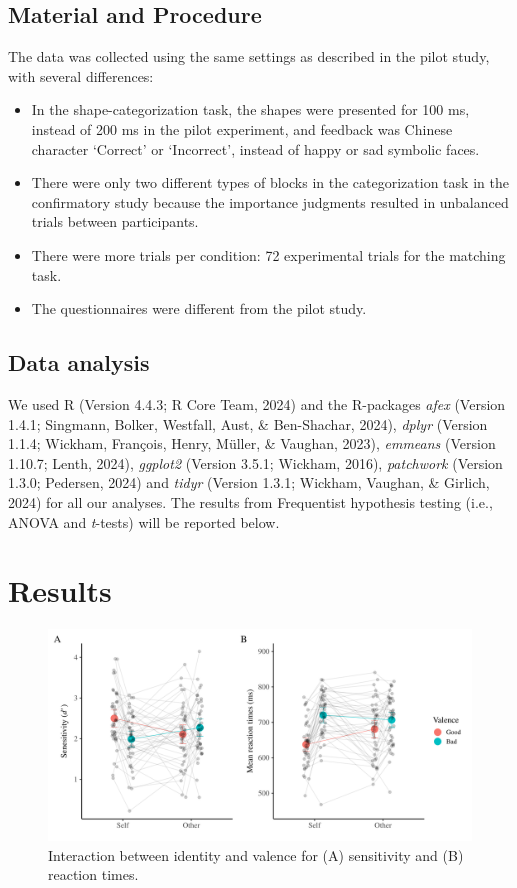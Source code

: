 \documentclass[
  man]{apa6}
\providecommand{\tightlist}{%
  \setlength{\itemsep}{0pt}\setlength{\parskip}{0pt}}
\begin{document}
\subsection{Material and Procedure}\label{material-and-procedure}

The data was collected using the same settings as described in the pilot study, with several differences:

\begin{itemize}
\tightlist
\item
  In the shape-categorization task, the shapes were presented for 100 ms, instead of 200 ms in the pilot experiment, and feedback was Chinese character `Correct' or `Incorrect', instead of happy or sad symbolic faces.
\item
  There were only two different types of blocks in the categorization task in the confirmatory study because the importance judgments resulted in unbalanced trials between participants.
\item
  There were more trials per condition: 72 experimental trials for the matching task.
\item
  The questionnaires were different from the pilot study.
\end{itemize}

\subsection{Data analysis}\label{data-analysis}

We used R (Version 4.4.3; R Core Team, 2024) and the R-packages \emph{afex} (Version 1.4.1; Singmann, Bolker, Westfall, Aust, \& Ben-Shachar, 2024), \emph{dplyr} (Version 1.1.4; Wickham, François, Henry, Müller, \& Vaughan, 2023), \emph{emmeans} (Version 1.10.7; Lenth, 2024), \emph{ggplot2} (Version 3.5.1; Wickham, 2016), \emph{patchwork} (Version 1.3.0; Pedersen, 2024) and \emph{tidyr} (Version 1.3.1; Wickham, Vaughan, \& Girlich, 2024) for all our analyses. The results from Frequentist hypothesis testing (i.e., ANOVA and \emph{t}-tests) will be reported below.

\section{Results}\label{results}

\begin{figure}
\centering
\includegraphics{chapter_13_papaja_files/figure-latex/plot1-1.pdf}
\caption{\label{fig:plot1}Interaction between identity and valence for (A) sensitivity and (B) reaction times.}
\end{figure}
\end{document}
